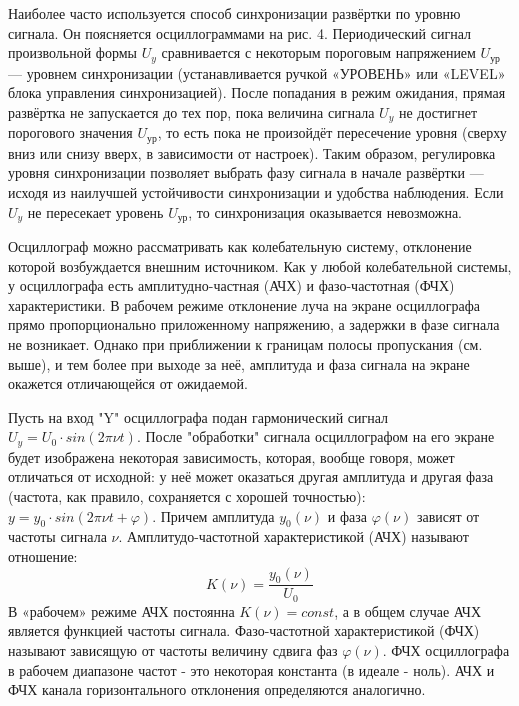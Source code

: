 \documentclass[a4paper]{article}
\begin{document}
Наиболее часто используется способ синхронизации развёртки по
уровню сигнала. Он поясняется осциллограммами на рис. 4. Периодический сигнал произвольной формы $U_{y}$ сравнивается с некоторым пороговым напряжением $U_{ур}$ — уровнем синхронизации (устанавливается ручкой «УРОВЕНЬ» или «LEVEL» блока управления синхронизацией). После попадания в режим ожидания, прямая развёртка не запускается до тех пор, пока величина сигнала $U_{y}$ не достигнет порогового значения $U_{ур}$, то есть пока не произойдёт пересечение уровня (сверху вниз или снизу вверх, в зависимости от настроек). Таким образом, регулировка уровня синхронизации
позволяет выбрать фазу сигнала в начале развёртки — исходя из наилучшей устойчивости синхронизации и удобства наблюдения. Если $U_{y}$ не пересекает уровень $U_{ур}$, то синхронизация оказывается невозможна.

Осциллограф можно рассматривать как колебательную систему, отклонение которой возбуждается внешним источником. Как у любой колебательной системы, у осциллографа есть амплитудно-частная
(АЧХ) и фазо-частотная (ФЧХ) характеристики. В рабочем режиме отклонение луча на экране осциллографа прямо пропорционально
приложенному напряжению, а задержки в фазе сигнала не возникает.
Однако при приближении к границам полосы пропускания (см. выше),
и тем более при выходе за неё, амплитуда и фаза сигнала на экране
окажется отличающейся от ожидаемой.

Пусть на вход "Y" осциллографа подан гармонический сигнал $U_{y} = U_{0} \cdot sin(2\pi \nu t)$. После "обработки" сигнала осциллографом на его экране будет изображена некоторая зависимость, которая, вообще говоря, может отличаться от исходной: у неё может оказаться другая амплитуда и другая фаза (частота, как правило, сохраняется с хорошей точностью): $y = y_{0} \cdot sin(2\pi\nu t + \varphi)$. Причем амплитуда $y_{0}(\nu)$ и фаза $\varphi(\nu)$ зависят от частоты сигнала $\nu$. Амплитудо-частотной характеристикой (АЧХ) называют отношение:
\[K(\nu) = \frac{y_{0}(\nu)}{U_{0}}\]
В «рабочем» режиме АЧХ постоянна $K(\nu) = const$, а в общем случае АЧХ является функцией частоты сигнала. Фазо-частотной характеристикой (ФЧХ) называют зависящую от частоты величину сдвига фаз $\varphi(\nu)$. ФЧХ осциллографа в рабочем диапазоне частот - это некоторая константа (в идеале - ноль). АЧХ и ФЧХ канала горизонтального отклонения определяются аналогично.
\end{document}
